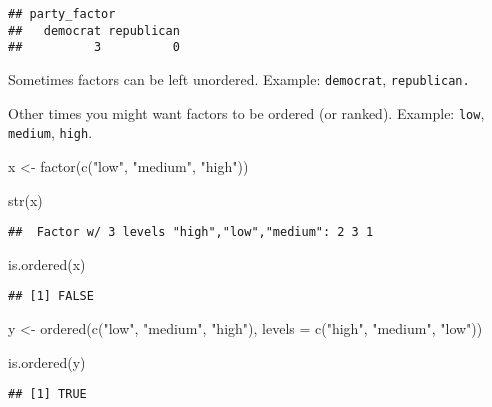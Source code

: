 \documentclass[
]{book}
\newenvironment{Shaded}{\begin{snugshade}}{\end{snugshade}}
\newcommand{\AttributeTok}[1]{\textcolor[rgb]{0.77,0.63,0.00}{#1}}
\newcommand{\FunctionTok}[1]{\textcolor[rgb]{0.00,0.00,0.00}{#1}}
\newcommand{\NormalTok}[1]{#1}
\newcommand{\OtherTok}[1]{\textcolor[rgb]{0.56,0.35,0.01}{#1}}
\newcommand{\StringTok}[1]{\textcolor[rgb]{0.31,0.60,0.02}{#1}}
\begin{document}
\begin{verbatim}
## party_factor
##   democrat republican 
##          3          0
\end{verbatim}

Sometimes factors can be left unordered. Example: \texttt{democrat}, \texttt{republican.}

Other times you might want factors to be ordered (or ranked). Example: \texttt{low}, \texttt{medium}, \texttt{high}.

\begin{Shaded}
\begin{Highlighting}[]
\NormalTok{x }\OtherTok{\textless{}{-}} \FunctionTok{factor}\NormalTok{(}\FunctionTok{c}\NormalTok{(}\StringTok{"low"}\NormalTok{, }\StringTok{"medium"}\NormalTok{, }\StringTok{"high"}\NormalTok{))}

\FunctionTok{str}\NormalTok{(x)}
\end{Highlighting}
\end{Shaded}

\begin{verbatim}
##  Factor w/ 3 levels "high","low","medium": 2 3 1
\end{verbatim}

\begin{Shaded}
\begin{Highlighting}[]
\FunctionTok{is.ordered}\NormalTok{(x)}
\end{Highlighting}
\end{Shaded}

\begin{verbatim}
## [1] FALSE
\end{verbatim}

\begin{Shaded}
\begin{Highlighting}[]
\NormalTok{y }\OtherTok{\textless{}{-}} \FunctionTok{ordered}\NormalTok{(}\FunctionTok{c}\NormalTok{(}\StringTok{"low"}\NormalTok{, }\StringTok{"medium"}\NormalTok{, }\StringTok{"high"}\NormalTok{), }\AttributeTok{levels =} \FunctionTok{c}\NormalTok{(}\StringTok{"high"}\NormalTok{, }\StringTok{"medium"}\NormalTok{, }\StringTok{"low"}\NormalTok{))}

\FunctionTok{is.ordered}\NormalTok{(y)}
\end{Highlighting}
\end{Shaded}

\begin{verbatim}
## [1] TRUE
\end{verbatim}
\end{document}
